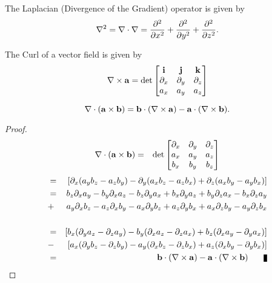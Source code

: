 \begin{definition}
The Laplacian (Divergence of the Gradient) operator is given by
\[ \nabla^2 = \nabla\cdot \nabla = {\partial^2\over\partial x^2} +{\partial^2\over\partial y^2} +{\partial^2\over\partial z^2}.\]
\end{definition}

\begin{definition}
The Curl of a vector field is given by
\begin{eqnarray*}
\nabla \times {\bf a} = 
\det\begin{bmatrix}
{\bf i} & {\bf j} & {\bf k}\\
\partial_x & \partial_y & \partial_z  \\
a_x& a_y & a_z \\
\end{bmatrix}
\end{eqnarray*}

\end{definition}

\begin{theorem}
\[ \nabla\cdot ({\bf a} \times {\bf b}) = {\bf b}\cdot (\nabla \times {\bf a}) - {\bf a} \cdot (\nabla \times {\bf b}). \]
\end{theorem}
\begin{proof}
\begin{eqnarray*}
\nabla\cdot({\bf a} \times {\bf b}) &=& 
\det\begin{bmatrix}
\partial_x & \partial_y & \partial_z\\
a_x & a_y & a_z  \\
b_x& b_y  & b_z  \\
\end{bmatrix}
\end{eqnarray*}
\begin{eqnarray*}
&=&[\partial_x (a_y b_z - a_z b_y)  - \partial_y(a_x b_z - a_z b_x) +  \partial_z(a_x b_y - a_y b_x) ]\\
&=&b_z \partial_x a_y - b_y \partial_x a_z  - b_z \partial_y a_x + b_x\partial_y a_z + b_y \partial_z a_x  - b_x\partial_z a_y  \\
&+&a_y \partial_x b_z - a_z\partial_x b_y  - a_x  \partial_y b_z + a_z \partial_y b_x + a_x \partial_z b_y  - a_y \partial_z b_x  \\ \\
&=& [b_x(\partial_y a_z  - \partial_z a_y) -  b_y (\partial_x a_z - \partial_z a_x ) +  b_z (\partial_x a_y  - \partial_y a_x)]    \\
&- & [a_x (\partial_y b_z - \partial_z b_y ) - a_y( \partial_x b_z - \partial_z b_x)  +  a_z(\partial_x b_y  - \partial_y b_x)]   \\
&=& {\bf b}\cdot (\nabla \times {\bf a}) - {\bf a}\cdot (\nabla \times {\bf b})\ \qed
\end{eqnarray*}
\end{proof}

